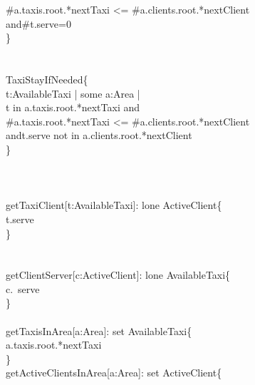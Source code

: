 	\qquad \-\qquad \#a.taxis.root.*nextTaxi <= \#a.clients.root.*nextClient \\
	\qquad \-\qquad and\-\qquad \#t.serve=0 \qquad \\
	\qquad \}\\
	\qquad \\
	\\
	 TaxiStayIfNeeded\{\\
	\qquad \- t:AvailableTaxi | {\color{blue}some} a:Area | \\
	\qquad \-\qquad t {\color{blue}in} a.taxis.root.*nextTaxi and\\
	\qquad \-\qquad \#a.taxis.root.*nextTaxi <= \#a.clients.root.*nextClient \\
	\qquad \-\qquad and\-\qquad t.serve {\color{blue}not} in a.clients.root.*nextClient \\
	\qquad \}\\
	\qquad \\
	\\
	\\
	 getTaxiClient[t:AvailableTaxi]: {\color{blue}lone} ActiveClient\{\\
	\qquad \-\qquad t.serve\\
	\qquad \}\\
	\qquad \\
	\\
	 getClientServer[c:ActiveClient]: {\color{blue}lone} AvailableTaxi\{\\
	\qquad \-\qquad c.~serve\\
	\qquad \}\\
	\\
	 getTaxisInArea[a:Area]: {\color{blue}set} AvailableTaxi\{\\
	\qquad \-\qquad a.taxis.root.*nextTaxi\\
	\qquad \}\\
	 getActiveClientsInArea[a:Area]: {\color{blue}set} ActiveClient\{\\
